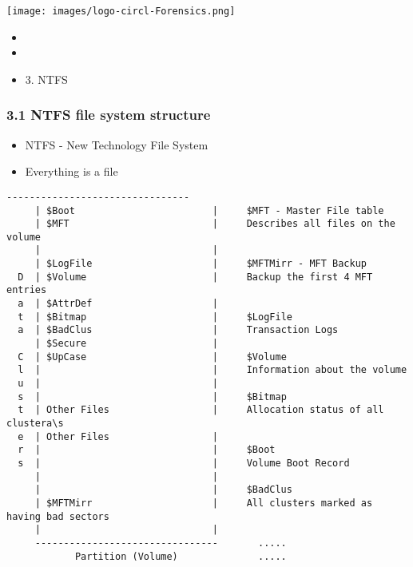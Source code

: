 %
%



\begin{frame}
    \texttt{[image: images/logo-circl-Forensics.png]}
    \begin{itemize}
        \item[]
        \item[]
        \item[] 3. NTFS
    \end{itemize}
\end{frame}


\begin{frame}[fragile]
  \frametitle{3.1 NTFS file system structure}
    \begin{itemize}
            \item NTFS - New Technology File System
            \item Everything is a file
    \end{itemize}
  \begin{lstlisting}[basicstyle=\tiny]
     --------------------------------
     | $Boot                        |     $MFT - Master File table
     | $MFT                         |     Describes all files on the volume
     |                              |     
     | $LogFile                     |     $MFTMirr - MFT Backup
  D  | $Volume                      |     Backup the first 4 MFT entries
  a  | $AttrDef                     |
  t  | $Bitmap                      |     $LogFile
  a  | $BadClus                     |     Transaction Logs
     | $Secure                      |
  C  | $UpCase                      |     $Volume
  l  |                              |     Information about the volume
  u  |                              |
  s  |                              |     $Bitmap
  t  | Other Files                  |     Allocation status of all clustera\s
  e  | Other Files                  |
  r  |                              |     $Boot
  s  |                              |     Volume Boot Record
     |                              |
     |                              |     $BadClus
     | $MFTMirr                     |     All clusters marked as having bad sectors
     |                              |
     --------------------------------		.....
            Partition (Volume)      		.....
  \end{lstlisting}
\end{frame}


